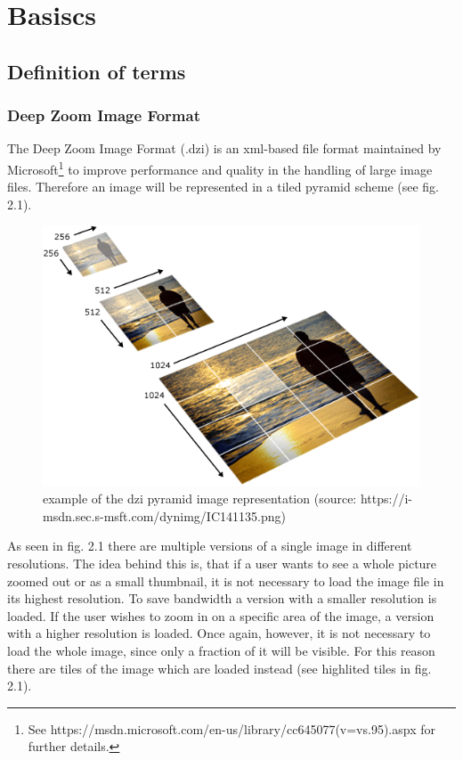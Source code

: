 \chapter{Basiscs}
	\section{Definition of terms}
		\subsection{Deep Zoom Image Format}
			The Deep Zoom Image Format (.dzi) is an
			xml-based file format maintained by Microsoft\footnote{See
			https://msdn.microsoft.com/en-us/library/cc645077(v=vs.95).aspx for further
			details.} to improve performance and quality in the handling of large image
			files. Therefore an image will be represented in a tiled pyramid scheme (see
			fig. 2.1).
			
			\begin{figure}[!htbp]
				\begin{center}
					\includegraphics[scale=0.5]{img/dzi_pyramid.png}
					\caption{example of the dzi pyramid image representation (source:
					https://i-msdn.sec.s-msft.com/dynimg/IC141135.png)}
					\label{fig:abb2.1}
				\end{center}
			\end{figure}

			As seen in fig. 2.1 there are multiple versions of a single image in
			different resolutions. The idea behind this is, that if a user wants to see a
			whole picture zoomed out or as a small thumbnail, it is not necessary to
			load the image file in its highest resolution. To save bandwidth a version
			with a smaller resolution is loaded. If the user wishes to zoom in on a
			specific area of the image, a version with a higher resolution is loaded.
			Once again, however, it is not necessary to load the whole image, since only
			a fraction of it will be visible. For this reason there are tiles of the
			image which are loaded instead (see highlited tiles in fig. 2.1).
			
